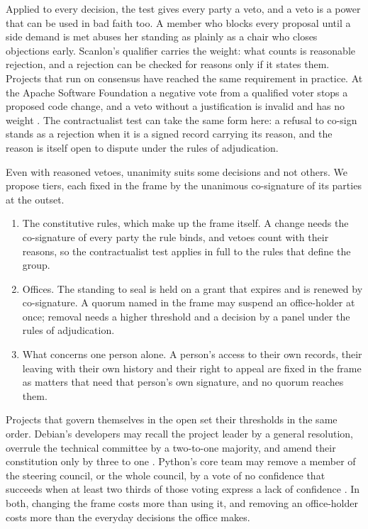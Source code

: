 Applied to every decision, the test gives every party a veto, and a veto is a power that can be used
in bad faith too. A member who blocks every proposal until a side demand is met abuses her standing
as plainly as a chair who closes objections early. Scanlon's qualifier carries the weight: what
counts is reasonable rejection, and a rejection can be checked for reasons only if it states them.
Projects that run on consensus have reached the same requirement in practice. At the Apache Software
Foundation a negative vote from a qualified voter stops a proposed code change, and a veto without a
justification is invalid and has no weight \citep{apache-voting}. The contractualist test can take
the same form here: a refusal to co-sign stands as a rejection when it is a signed record carrying
its reason, and the reason is itself open to dispute under the rules of adjudication.

Even with reasoned vetoes, unanimity suits some decisions and not others. We propose tiers, each
fixed in the frame by the unanimous co-signature of its parties at the outset.
\begin{enumerate}[leftmargin=1.5em,itemsep=2pt]
  \item The constitutive rules, which make up the frame itself. A change needs the co-signature of
    every party the rule binds, and vetoes count with their reasons, so the contractualist test
    applies in full to the rules that define the group.
  \item Offices. The standing to seal is held on a grant that expires and is renewed by
    co-signature. A quorum named in the frame may suspend an office-holder at once; removal needs a
    higher threshold and a decision by a panel under the rules of adjudication.
  \item What concerns one person alone. A person's access to their own records, their leaving with
    their own history and their right to appeal are fixed in the frame as matters that need that
    person's own signature, and no quorum reaches them.
\end{enumerate}
Projects that govern themselves in the open set their thresholds in the same order. Debian's
developers may recall the project leader by a general resolution, overrule the technical committee
by a two-to-one majority, and amend their constitution only by three to one \citep{debian2022}.
Python's core team may remove a member of the steering council, or the whole council, by a vote of
no confidence that succeeds when at least two thirds of those voting express a lack of confidence
\citep{pep13}. In both, changing the frame costs more than using it, and removing an office-holder
costs more than the everyday decisions the office makes.

